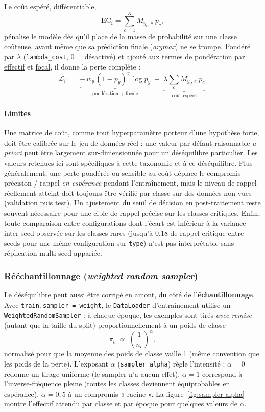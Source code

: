 Le coût espéré, différentiable,
\[
  \mathrm{EC}_i = \sum_{c=1}^{K} M_{y_i,\,c}\; p_c ,
\]
pénalise le modèle dès qu’il place de la masse de probabilité sur une classe coûteuse, avant même que sa prédiction finale (\emph{argmax}) ne se trompe.
Pondéré par $\lambda$ (\texttt{lambda\_cost}, 0 = désactivé) et ajouté aux termes de \hyperref[sec:ponderation-effectif]{pondération par effectif} et \hyperref[sec:terme-focal]{focal}, il donne la perte complète :
\[
  \mathcal{L}_i \;=\; \underbrace{-\, w_y\,(1-p_y)^{\gamma}\,\log p_y}_{\text{pondération + focale}} \;+\; \underbrace{\lambda \sum_{c} M_{y_i,\,c}\; p_c}_{\text{coût espéré}} .
\]

\paragraph{Limites}
\label{sec:limites-loss}

Une matrice de coût, comme tout hyperparamètre porteur d’une hypothèse forte, doit être calibrée sur le jeu de données réel : une valeur par défaut raisonnable \emph{a priori} peut être largement sur-dimensionnée pour un déséquilibre particulier.
Les valeurs retenues ici sont spécifiques à cette taxonomie et à ce déséquilibre.
Plus généralement, une perte pondérée ou sensible au coût déplace le compromis précision / rappel \emph{en espérance} pendant l’entraînement, mais le niveau de rappel réellement atteint doit toujours être vérifié par classe sur des données non vues (validation puis test).
Un ajustement du seuil de décision en post-traitement reste souvent nécessaire pour une cible de rappel précise sur les classes critiques.
Enfin, toute comparaison entre configurations dont l’écart est inférieur à la variance inter-seed observée sur les classes rares (jusqu’à 0,18 de rappel critique entre seeds pour une même configuration sur \texttt{type}) n’est pas interprétable sans réplication multi-seed appariée.

\subsubsection{Rééchantillonnage (\emph{weighted random sampler})}
\label{sec:reechantillonnage}

Le déséquilibre peut aussi être corrigé en amont, du côté de l’\textbf{échantillonnage}. 
Avec \texttt{train.sampler = weight}, le \texttt{DataLoader} d’entraînement utilise un \texttt{WeightedRandomSampler} : à chaque époque, les exemples sont tirés \emph{avec remise} (autant que la taille du split) proportionnellement à un poids de classe
\[
  \pi_c \;\propto\; \left(\frac{1}{n_c}\right)^{\!\alpha},
\]
normalisé pour que la moyenne des poids de classe vaille 1 (même convention que les poids de la perte). 
L’exposant $\alpha$ (\texttt{sampler\_alpha}) règle l’intensité : $\alpha = 0$ redonne un tirage uniforme (le sampler n’a aucun effet), $\alpha = 1$ correspond à l’inverse-fréquence pleine (toutes les classes deviennent équiprobables en espérance), $\alpha = 0{,}5$ à un compromis « racine ». 
La figure~\ref{fig:sampler-alpha} montre l’effectif attendu par classe et par époque pour quelques valeurs de $\alpha$.


